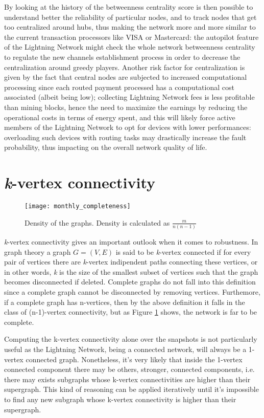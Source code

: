 	By looking at the history of the betweenness centrality score is then possible to understand better the reliability of particular nodes, and to track nodes that get too centralized around hubs, thus making the network more and more similar to the current transaction processors like VISA or Mastercard: the autopilot feature of the Lightning Network might check the whole network betweenness centrality to regulate the new channels establishment process in order to decrease the centralization around greedy players. Another risk factor for centralization is given by the fact that central nodes are subjected to increased computational processing since each routed payment processed has a computational cost associated (albeit being low); collecting Lightning Network fees is less profitable than mining blocks, hence the need to maximize the earnings by reducing the operational costs in terms of energy spent, and this will likely force active members of the Lightning Network to opt for devices with lower performances: overloading such devices with routing tasks may drastically increase the fault probability, thus impacting on the overall network quality of life.
	
	\section{\textit{k}-vertex connectivity}

	\begin{figure}[h!]
		\texttt{[image: monthly\_completeness]}
		\caption{Density of the graphs. Density is calculated as $\frac{m}{n(n-1)}$}
		\label{monthly_completeness}
	\end{figure}
	
	\textit{k}-vertex connectivity gives an important outlook when it comes to robustness. In graph theory a graph $G = (V,E)$ is said to be \textit{k}-vertex connected if for every pair of vertices there are \textit{k}-vertex indipendent paths connecting these vertices, or in other words, \textit{k} is the size of the smallest subset of vertices such that the graph becomes disconnected if deleted. Complete graphs do not fall into this definition since a complete graph cannot be disconnected by removing vertices. Furthemore, if a complete graph has n-vertices, then by the above definition it falls in the class of (n-1)-vertex connectivity, but as Figure \ref{monthly_completeness} shows, the network is far to be complete.

	Computing the k-vertex connectivity alone over the snapshots is not particularly useful as the Lightning Network, being a connected network, will always be a 1-vertex connected graph. Nonetheless, it's very likely that inside the 1-vertex connected component there may be others, stronger, connected components, i.e. there may exists subgraphs whose k-vertex connectivities are higher than their supergraph. This kind of reasoning can be applied iteratively until it's impossible to find any new subgraph whose k-vertex connectivity is higher than their supergraph.
	
